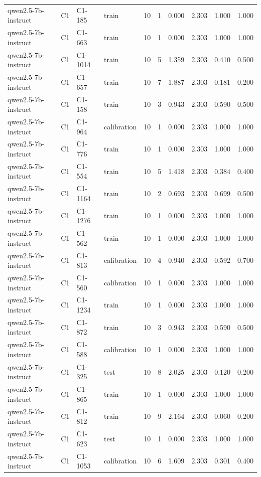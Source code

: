\begin{table}
\begin{tabular}{llllrrrrrr}
qwen2.5-7b-instruct & C1 & C1-185 & train & 10 & 1 & 0.000 & 2.303 & 1.000 & 1.000 \\
qwen2.5-7b-instruct & C1 & C1-663 & train & 10 & 1 & 0.000 & 2.303 & 1.000 & 1.000 \\
qwen2.5-7b-instruct & C1 & C1-1014 & train & 10 & 5 & 1.359 & 2.303 & 0.410 & 0.500 \\
qwen2.5-7b-instruct & C1 & C1-657 & train & 10 & 7 & 1.887 & 2.303 & 0.181 & 0.200 \\
qwen2.5-7b-instruct & C1 & C1-158 & train & 10 & 3 & 0.943 & 2.303 & 0.590 & 0.500 \\
qwen2.5-7b-instruct & C1 & C1-964 & calibration & 10 & 1 & 0.000 & 2.303 & 1.000 & 1.000 \\
qwen2.5-7b-instruct & C1 & C1-776 & train & 10 & 1 & 0.000 & 2.303 & 1.000 & 1.000 \\
qwen2.5-7b-instruct & C1 & C1-554 & train & 10 & 5 & 1.418 & 2.303 & 0.384 & 0.400 \\
qwen2.5-7b-instruct & C1 & C1-1164 & train & 10 & 2 & 0.693 & 2.303 & 0.699 & 0.500 \\
qwen2.5-7b-instruct & C1 & C1-1276 & train & 10 & 1 & 0.000 & 2.303 & 1.000 & 1.000 \\
qwen2.5-7b-instruct & C1 & C1-562 & train & 10 & 1 & 0.000 & 2.303 & 1.000 & 1.000 \\
qwen2.5-7b-instruct & C1 & C1-813 & calibration & 10 & 4 & 0.940 & 2.303 & 0.592 & 0.700 \\
qwen2.5-7b-instruct & C1 & C1-560 & calibration & 10 & 1 & 0.000 & 2.303 & 1.000 & 1.000 \\
qwen2.5-7b-instruct & C1 & C1-1234 & train & 10 & 1 & 0.000 & 2.303 & 1.000 & 1.000 \\
qwen2.5-7b-instruct & C1 & C1-872 & train & 10 & 3 & 0.943 & 2.303 & 0.590 & 0.500 \\
qwen2.5-7b-instruct & C1 & C1-588 & calibration & 10 & 1 & 0.000 & 2.303 & 1.000 & 1.000 \\
qwen2.5-7b-instruct & C1 & C1-325 & test & 10 & 8 & 2.025 & 2.303 & 0.120 & 0.200 \\
qwen2.5-7b-instruct & C1 & C1-865 & train & 10 & 1 & 0.000 & 2.303 & 1.000 & 1.000 \\
qwen2.5-7b-instruct & C1 & C1-812 & train & 10 & 9 & 2.164 & 2.303 & 0.060 & 0.200 \\
qwen2.5-7b-instruct & C1 & C1-623 & test & 10 & 1 & 0.000 & 2.303 & 1.000 & 1.000 \\
qwen2.5-7b-instruct & C1 & C1-1053 & calibration & 10 & 6 & 1.609 & 2.303 & 0.301 & 0.400 \\

\end{tabular}
\end{table}
